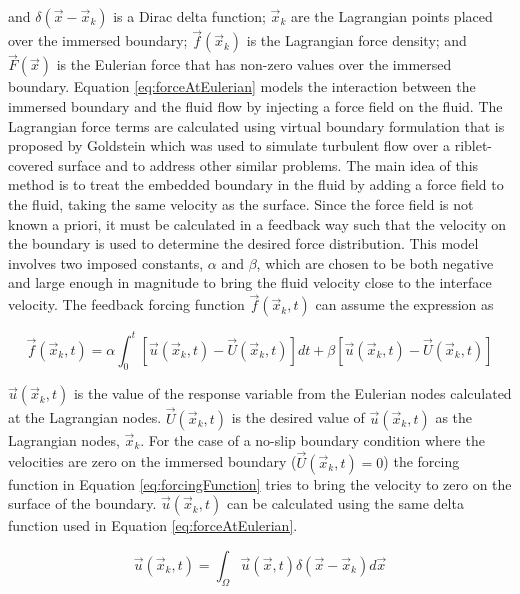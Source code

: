 \documentclass[12pt]{aiaa-pretty}
\begin{document}
and $\delta(\vec{x} - \vec{x}_k)$ is a Dirac delta function; $\vec{x}_k$ are the Lagrangian points placed over the immersed boundary; $\vec{f}(\vec{x}_k)$ is the Lagrangian force density; and $\vec{F}(\vec{x})$ is the Eulerian force that has non-zero values over the immersed boundary. Equation \eqref{eq:forceAtEulerian} models the interaction between the immersed boundary and the fluid flow by injecting a force field on the fluid. The Lagrangian force terms are calculated using virtual boundary formulation that is proposed by Goldstein \cite{goldstein1993modeling} which was used to simulate turbulent flow over a riblet-covered surface and to address other similar problems. The main idea of this method is to treat the embedded boundary in the fluid by adding a force field to the fluid, taking the same velocity as the surface. Since the force field is not known a priori, it must be calculated in a feedback way such that the velocity on the boundary is used to determine the desired force distribution. This model involves two imposed constants, $\alpha$ and $\beta$, which are chosen to be both negative and large enough in magnitude to bring the fluid velocity close to the interface velocity. The feedback forcing function $\vec{f}(\vec{x}_k, t)$ can assume the expression as

%
\begin{equation}\label{eq:forcingFunction}
	\vec{f}\left( \vec{x}_k, t \right) = 
	\alpha \int_0^t \left[ \vec{u}\left( \vec{x}_k, t \right) - \vec{U}\left( \vec{x}_k, t \right) \right]dt + 
	\beta \left[ \vec{u}\left( \vec{x}_k, t \right) - \vec{U}\left( \vec{x}_k, t \right) \right]
\end{equation}
%

$\vec{u}\left( \vec{x}_k, t \right)$ is the value of the response variable from the Eulerian nodes calculated at the Lagrangian nodes. $\vec{U}\left( \vec{x}_k, t \right)$ is the desired value of $\vec{u}\left( \vec{x}_k, t \right)$ as the Lagrangian nodes, $\vec{x}_k$. For the case of a no-slip boundary condition where the velocities are zero on the immersed boundary ($\vec{U}\left( \vec{x}_k, t \right) = 0 $) the forcing function in Equation \eqref{eq:forcingFunction} tries to bring the velocity to zero on the surface of the boundary. $\vec{u}\left( \vec{x}_k, t \right)$ can be calculated using the same delta function used in Equation \eqref{eq:forceAtEulerian}.

%
\begin{equation}\label{eq:velocityAtLagrangian}
	\vec{u}(\vec{x}_k, t) = \int_\Omega \vec{u} (\vec{x}, t) \delta(\vec{x} - \vec{x}_k) d\vec{x}
\end{equation}
%
\end{document}
